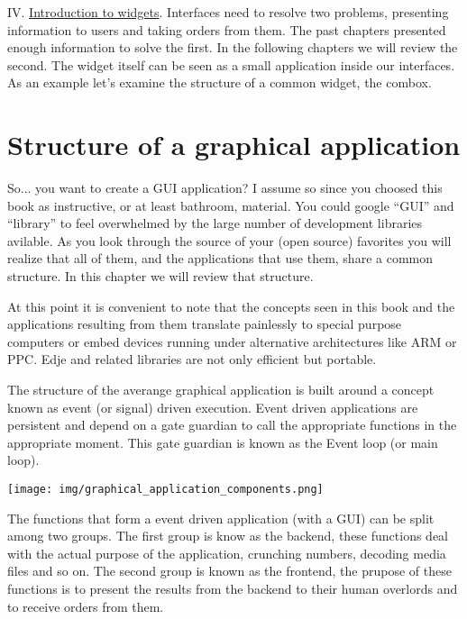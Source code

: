\documentclass[12pt,a4paper,english]{book}
\begin{document}
IV. \href{\#introduction-to-widgets}{Introduction to widgets}.
Interfaces need to resolve two problems, presenting information to users and
taking orders from them. The past chapters presented enough information to
solve the first. In the following chapters we will review the second. The
widget itself can be seen as a small application inside our interfaces. As an
example let's examine the structure of a common widget, the combox.



\hypertarget{structure-of-a-graphical-application}{}
\chapter{Structure of a graphical application}
\label{structure-of-a-graphical-application}

So... you want to create a GUI application? I assume so since you choosed this
book as instructive, or at least bathroom, material. You could google ``GUI'' and
``library'' to feel overwhelmed by the large number of development libraries
avilable. As you look through the source of your (open source) favorites you
will realize that all of them, and the applications that use them, share a
common structure. In this chapter we will review that structure.

At this point it is convenient to note that the concepts seen in this book and
the applications resulting from them translate painlessly to special purpose
computers or embed devices running under alternative architectures like ARM or
PPC. Edje and related libraries are not only efficient but portable.

The structure of the averange graphical application is built around a concept
known as event (or signal) driven execution. Event driven applications are
persistent and depend on a gate guardian to call the appropriate functions in
the appropriate moment. This gate guardian is known as the Event loop (or main
loop).

{\hfill\texttt{[image: img/graphical\_application\_components.png]}\hfill}

The functions that form a event driven application (with a GUI) can be split
among two groups. The first group is know as the backend, these functions deal
with the actual purpose of the application, crunching numbers, decoding media
files and so on. The second group is known as the frontend, the prupose of
these functions is to present the results from the backend to their human
overlords and to receive orders from them.
\end{document}
